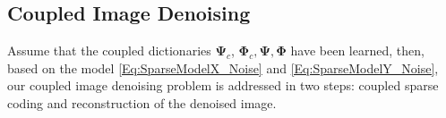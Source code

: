 \documentclass{article}
\begin{document}

\vspace{-0.2cm}

\subsection{Coupled Image Denoising}
Assume that the coupled dictionaries $\boldsymbol{\Psi}_{c} $, $\boldsymbol{\Phi}_{c}, \boldsymbol{\Psi}, \boldsymbol{\Phi}$ have been learned, then, based on the model \eqref{Eq:SparseModelX_Noise} and \eqref{Eq:SparseModelY_Noise}, our coupled image denoising problem is addressed in two steps: coupled sparse coding and reconstruction of the denoised image.
%
\end{document}
